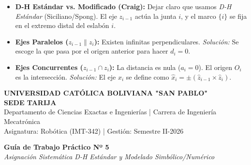 \documentclass[11pt, a4paper]{article}
\begin{document}
\vspace{0.4cm}
\begin{tcolorbox}[colback=red!5!white, colframe=red!75!black, title=\textbf{3. Obstáculos Conceptuales Típicos y Tratamiento}]
\begin{itemize}[leftmargin=*]
    \item \textbf{D-H Estándar vs. Modificado (Craig):} Dejar claro que usamos \textit{D-H Estándar} (Siciliano/Spong). El eje $z_{i-1}$ actúa la junta $i$, y el marco $\{i\}$ se fija en el extremo distal del eslabón $i$.
    \item \textbf{Ejes Paralelos ($z_{i-1} \parallel z_i$):} Existen infinitas perpendiculares. \textit{Solución:} Se escoge la que pasa por el origen anterior para hacer $d_i = 0$.
    \item \textbf{Ejes Concurrentes ($z_{i-1} \cap z_i$):} La distancia es nula ($a_i = 0$). El origen $O_i$ es la intersección. \textit{Solución:} El eje $x_i$ se define como $\hat{x}_i = \pm (\hat{z}_{i-1} \times \hat{z}_i)$.
\end{itemize}
\end{tcolorbox}

\newpage
\begin{center}
    \Large\textbf{\textcolor{ucbblue}{UNIVERSIDAD CATÓLICA BOLIVIANA "SAN PABLO"}}\\
    \large\textbf{SEDE TARIJA}\\
    \vspace{0.2cm}
    \normalsize Departamento de Ciencias Exactas e Ingenierías | Carrera de Ingeniería Mecatrónica\\
    Asignatura: Robótica (IMT-342) | Gestión: Semestre II-2026
\end{center}

\vspace{0.4cm}
\begin{center}
    \Large\textbf{Guía de Trabajo Práctico Nº 5}\\
    \large\textit{Asignación Sistemática D-H Estándar y Modelado Simbólico/Numérico}
\end{center}
\end{document}
